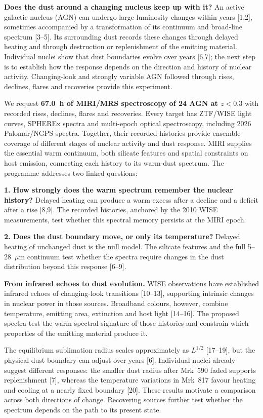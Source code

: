 \documentclass[12pt]{article}
\begin{document}
\scientificjustification

\noindent\textbf{Does the dust around a changing nucleus keep up with it?}
An active galactic nucleus (AGN) can undergo large luminosity changes within years [1,2], sometimes accompanied by a transformation of its continuum and broad-line spectrum [3--5]. Its surrounding dust records these changes through delayed heating and through destruction or replenishment of the emitting material. Individual nuclei show that dust boundaries evolve over years [6,7]; the next step is to establish how the response depends on the direction and history of nuclear activity. Changing-look and strongly variable AGN followed through rises, declines, flares and recoveries provide this experiment.

We request \textbf{67.0~h of MIRI/MRS spectroscopy of 24 AGN at $z<0.3$} with recorded rises, declines, flares and recoveries. Every target has ZTF/WISE light curves, SPHEREx spectra and multi-epoch optical spectroscopy, including 2026 Palomar/NGPS spectra. Together, their recorded histories provide ensemble coverage of different stages of nuclear activity and dust response. MIRI supplies the essential warm continuum, both silicate features and spatial constraints on host emission, connecting each history to its warm-dust spectrum. The programme addresses two linked questions:

\noindent\textbf{1. How strongly does the warm spectrum remember the nuclear history?} Delayed heating can produce a warm excess after a decline and a deficit after a rise [8,9]. The recorded histories, anchored by the 2010 WISE measurements, test whether this spectral memory persists at the MIRI epoch.

\noindent\textbf{2. Does the dust boundary move, or only its temperature?} Delayed heating of unchanged dust is the null model. The silicate features and the full 5--28~$\mu$m continuum test whether the spectra require changes in the dust distribution beyond this response [6--9].

\noindent\textbf{From infrared echoes to dust evolution.}
WISE observations have established infrared echoes of changing-look transitions [10--13], supporting intrinsic changes in nuclear power in those sources. Broadband colours, however, combine temperature, emitting area, extinction and host light [14--16]. The proposed spectra test the warm spectral signature of those histories and constrain which properties of the emitting material produce it.

The equilibrium sublimation radius scales approximately as $L^{1/2}$ [17--19], but the physical dust boundary can adjust over years [6]. Individual nuclei already suggest different responses: the smaller dust radius after Mrk~590 faded supports replenishment [7], whereas the temperature variations in Mrk~817 favour heating and cooling at a nearly fixed boundary [20]. These results motivate a comparison across both directions of change. Recovering sources further test whether the spectrum depends on the path to its present state.
\end{document}
